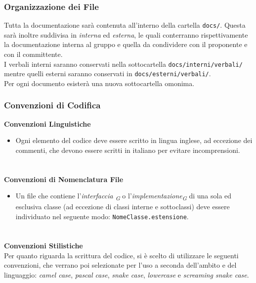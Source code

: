 \documentclass[a4paper, 12pt]{article}
\begin{document}
\subsubsection{Organizzazione dei File}
Tutta la documentazione sarà contenuta all'interno della cartella \texttt{docs/}. Questa sarà inoltre suddivisa in \textit{interna} ed \textit{esterna}, le quali conterranno rispettivamente la documentazione interna al gruppo e quella da condividere con il proponente e con il committente. \\
I verbali interni saranno conservati nella sottocartella \texttt{docs/interni/verbali/} mentre quelli esterni saranno conservati in \texttt{docs/esterni/verbali/}.\\
Per ogni documento esisterà una nuova sottocartella omonima.

\subsubsection{Convenzioni di Codifica}
\textbf{Convenzioni Linguistiche} \newline
\begin{itemize}
    \item Ogni elemento del codice deve essere scritto in lingua inglese, ad eccezione dei commenti, che devono essere scritti in italiano per evitare incomprensioni.
\end{itemize}
\paragraph{}\\
\textbf{Convenzioni di Nomenclatura File}
\begin{itemize}
    \item Un file che contiene l'\textit{interfaccia \textsubscript{G}} o l'\textit{implementazione\textsubscript{G}} di una sola ed esclusiva classe (ad eccezione di classi interne e sottoclassi) deve essere individuato nel seguente modo: \texttt{NomeClasse.estensione}.
\end{itemize}
\paragraph{} \\
\textbf{Convenzioni Stilistiche} \\
Per quanto riguarda la scrittura del codice, si è scelto di utilizzare le seguenti convenzioni, che verrano poi selezionate per l'uso a seconda dell'ambito e del linguaggio: \textit{camel case}, \textit{pascal case}, \textit{snake case}, \textit{lowercase} e \textit{screaming snake case}.\\ \\
\end{document}
